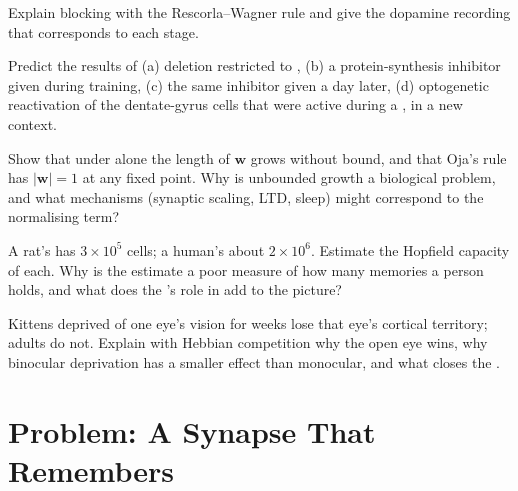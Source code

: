 \begin{exercise}[$\star\star$]\label{exo:b3:learning-memory:8}
Explain blocking with the Rescorla--Wagner rule and give the dopamine
recording that corresponds to each stage.
\end{exercise}

\begin{exercise}[$\star\star$]\label{exo:b3:learning-memory:9}
Predict the results of (a)  deletion restricted to ,
(b) a protein-synthesis inhibitor given during training, (c) the same
inhibitor given a day later, (d) optogenetic reactivation of the
dentate-gyrus cells that were active during a , in a
new context.
\end{exercise}

\begin{exercise}[$\star\star\star$]\label{exo:b3:learning-memory:10}
Show that under  alone the length of $\mathbf{w}$ grows
without bound, and that Oja's rule has $|\mathbf{w}| = 1$ at any fixed
point. Why is unbounded growth a biological problem, and what
mechanisms (synaptic scaling, LTD, sleep) might correspond to the
normalising term?
\end{exercise}

\begin{exercise}[$\star\star\star$]\label{exo:b3:learning-memory:11}
A rat's  has $3\times 10^{5}$ cells; a human's about $2\times 10^{6}$.
Estimate the Hopfield capacity of each. Why is the estimate a poor
measure of how many memories a person holds, and what does the
's role in  add to the picture?
\end{exercise}

\begin{exercise}[$\star\star\star$]\label{exo:b3:learning-memory:12}
Kittens deprived of one eye's vision for weeks lose that eye's cortical
territory; adults do not. Explain with Hebbian competition why the
open eye wins, why binocular deprivation has a smaller effect than
monocular, and what closes the .
\end{exercise}

\section{Problem: A Synapse That Remembers}

